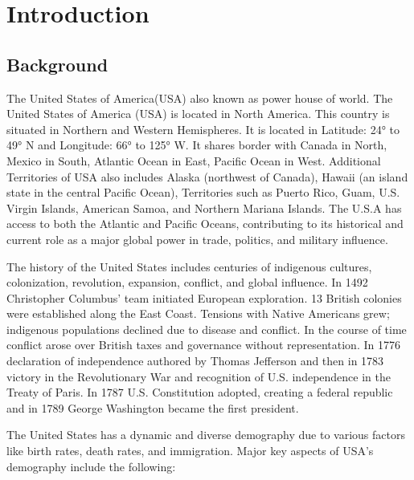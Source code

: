 \section{Introduction}

\subsection{Background}

The United States of America(USA) also known as power house of world. The United States of America (USA) is located in North America. This country is situated in Northern and Western Hemispheres. It is located in Latitude: 24° to 49° N and Longitude: 66° to 125° W. It shares border with Canada in North, Mexico in South, Atlantic Ocean in East, Pacific Ocean in West.  Additional Territories of USA also includes Alaska (northwest of Canada), Hawaii (an island state in the central Pacific Ocean), Territories such as Puerto Rico, Guam, U.S. Virgin Islands, American Samoa, and Northern Mariana Islands. The U.S.A has access to both the Atlantic and Pacific Oceans, contributing to its historical and current role as a major global power in trade, politics, and military influence.

The history of the United States includes centuries of indigenous cultures, colonization, revolution, expansion, conflict, and global influence. In 1492 Christopher Columbus' team initiated European exploration. 13 British colonies were established along the East Coast. Tensions with Native Americans grew; indigenous populations declined due to disease and conflict. In the course of time conflict arose over British taxes and governance without representation. In 1776 declaration of independence authored by Thomas Jefferson and then in 1783 victory in the Revolutionary War and recognition of U.S. independence in the Treaty of Paris. In 1787 U.S. Constitution adopted, creating a federal republic and in 1789 George Washington became the first president.

The United States has a dynamic and diverse demography due to various factors like birth rates, death rates, and immigration. Major key aspects of USA’s demography include the following:



